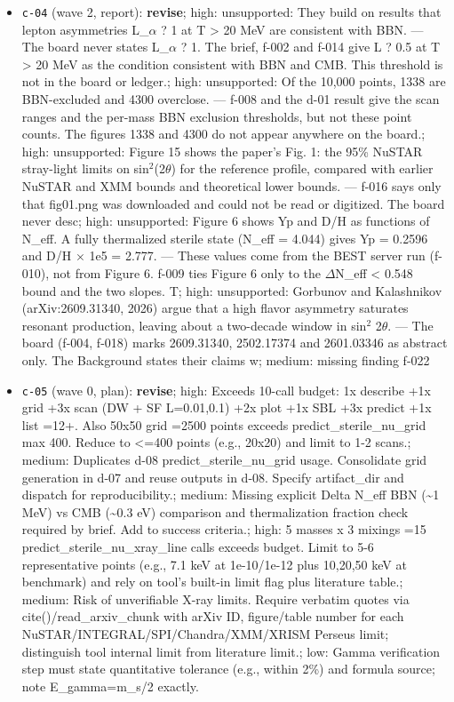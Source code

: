 \documentclass[11pt,a4paper]{article}
\begin{document}
\begin{itemize}
  \item \texttt{c-04} (wave 2, report): \textbf{revise}; high: unsupported: They build on results that lepton asymmetries L\_$\alpha$ ? 1 at T \textgreater{} 20 MeV are consistent with BBN. --- The board never states L\_$\alpha$ ? 1. The brief, f-002 and f-014 give L ? 0.5 at T \textgreater{} 20 MeV as the condition consistent with BBN and CMB. This threshold is not in the board or ledger.; high: unsupported: Of the 10,000 points, 1338 are BBN-excluded and 4300 overclose. --- f-008 and the d-01 result give the scan ranges and the per-mass BBN exclusion thresholds, but not these point counts. The figures 1338 and 4300 do not appear anywhere on the board.; high: unsupported: Figure 15 shows the paper's Fig. 1: the 95\% NuSTAR stray-light limits on sin$^2$(2$\theta$) for the reference profile, compared with earlier NuSTAR and XMM bounds and theoretical lower bounds. --- f-016 says only that fig01.png was downloaded and could not be read or digitized. The board never desc; high: unsupported: Figure 6 shows Yp and D/H as functions of N\_eff. A fully thermalized sterile state (N\_eff = 4.044) gives Yp = 0.2596 and D/H $\times$ 1e5 = 2.777. --- These values come from the BEST server run (f-010), not from Figure 6. f-009 ties Figure 6 only to the $\Delta$N\_eff \textless{} 0.548 bound and the two slopes. T; high: unsupported: Gorbunov and Kalashnikov (arXiv:2609.31340, 2026) argue that a high flavor asymmetry saturates resonant production, leaving about a two-decade window in sin$^2$ 2$\theta$. --- The board (f-004, f-018) marks 2609.31340, 2502.17374 and 2601.03346 as abstract only. The Background states their claims w; medium: missing finding f-022
  \item \texttt{c-05} (wave 0, plan): \textbf{revise}; high: Exceeds 10-call budget: 1x describe +1x grid +3x scan (DW + SF L=0.01,0.1) +2x plot +1x SBL +3x predict +1x list =12+. Also 50x50 grid =2500 points exceeds predict\_sterile\_nu\_grid max 400. Reduce to \textless{}=400 points (e.g., 20x20) and limit to 1-2 scans.; medium: Duplicates d-08 predict\_sterile\_nu\_grid usage. Consolidate grid generation in d-07 and reuse outputs in d-08. Specify artifact\_dir and dispatch for reproducibility.; medium: Missing explicit Delta N\_eff BBN (\textasciitilde{}1 MeV) vs CMB (\textasciitilde{}0.3 eV) comparison and thermalization fraction check required by brief. Add to success criteria.; high: 5 masses x 3 mixings =15 predict\_sterile\_nu\_xray\_line calls exceeds budget. Limit to 5-6 representative points (e.g., 7.1 keV at 1e-10/1e-12 plus 10,20,50 keV at benchmark) and rely on tool's built-in limit flag plus literature table.; medium: Risk of unverifiable X-ray limits. Require verbatim quotes via cite()/read\_arxiv\_chunk with arXiv ID, figure/table number for each NuSTAR/INTEGRAL/SPI/Chandra/XMM/XRISM Perseus limit; distinguish tool internal limit from literature limit.; low: Gamma verification step must state quantitative tolerance (e.g., within 2\%) and formula source; note E\_gamma=m\_s/2 exactly.

\end{itemize}
\end{document}
